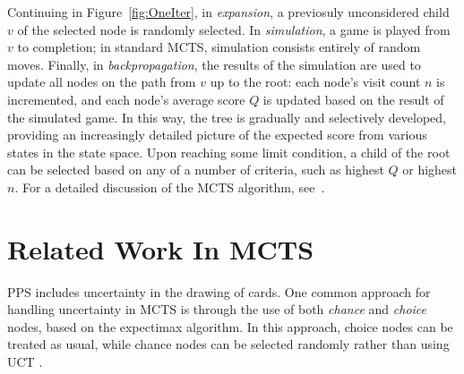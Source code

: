 \documentclass[letterpaper]{article}
\begin{document}
Continuing in Figure~\ref{fig:OneIter}, in {\it expansion}, a previosuly unconsidered child $v$ of the selected node is randomly selected. In {\it simulation}, a game is played from $v$ to completion; in standard MCTS, simulation consists entirely of random moves. Finally, in {\it backpropagation}, the results of the simulation are used to update all nodes on the path from $v$ up to the root: each node's visit count $n$ is incremented, and each node's average score $Q$ is updated based on the result of the simulated game. In this way, the tree is gradually and selectively developed, providing an increasingly detailed picture of the expected score from various states in the state space. Upon reaching some limit condition, a child of the root can be selected based on any of a number of criteria, such as highest $Q$ or highest $n$. For a detailed discussion of the MCTS algorithm, see~\cite{browne2012survey}.

\section{Related Work In MCTS}




PPS includes uncertainty in the drawing of cards. One common approach for handling uncertainty in MCTS is through the use of both {\it chance} and {\it choice} nodes, based on the expectimax  algorithm. In this approach, choice nodes can be treated as usual, while chance nodes can be selected randomly rather than using UCT \cite{melko2007optimal, hauk2004search}.
\end{document}
